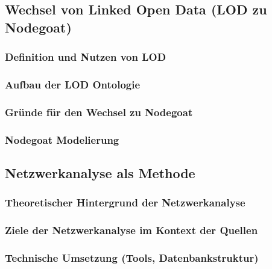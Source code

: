 \documentclass[12pt, a4paper, ngerman, bidi=default]{article}
\begin{document}
      \subsection{Wechsel von Linked Open Data (LOD zu Nodegoat)}
        \subsubsection{Definition und Nutzen von LOD}
        \subsubsection{Aufbau der LOD Ontologie}
        \subsubsection{Gründe für den Wechsel zu Nodegoat}
        \subsubsection{Nodegoat Modelierung}


  \subsection{Netzwerkanalyse als Methode}
        \subsubsection{Theoretischer Hintergrund der Netzwerkanalyse}
        \subsubsection{Ziele der Netzwerkanalyse im Kontext der Quellen}
        \subsubsection{Technische Umsetzung (Tools, Datenbankstruktur)}
\end{document}
